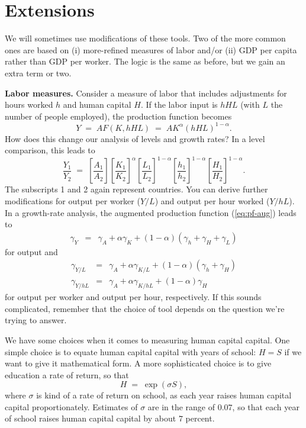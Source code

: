 \section{Extensions}

We will sometimes use modifications of these tools.
Two of the more common ones are based on
(i) more-refined measures of labor
and/or (ii) GDP per capita rather than GDP per worker.
The logic is the same as before, but we gain an extra term or two.


\textbf{Labor measures.} Consider a measure of labor that includes
adjustments for hours worked $h$ and human capital  $H$.
If the labor input is $hHL$ (with $L$ the number of people employed),
the production function becomes
\begin{equation}
    Y \;=\; A F(K,hHL) \;=\; A K^\alpha (hHL)^{1-\alpha} .
    \label{eq:pf-aug}
\end{equation}
How does this change our analysis of levels and growth rates?
In a  level comparison, this leads to
\[
    \frac{Y_1}{Y_2} \;=\;
             \left[ \frac{A_1}{A_2} \right]
             \left[ \frac{K_1}{K_2} \right]^\alpha
             \left[ \frac{L_1}{L_2} \right]^{1-\alpha}
             \left[ \frac{h_1}{h_2} \right]^{1-\alpha}
             \left[ \frac{H_1}{H_2} \right]^{1-\alpha} .
\]
The subscripts 1 and 2 again represent countries.
You can derive further modifications for output per worker ($Y/L$)
and output per hour worked ($Y/hL$).
In a growth-rate analysis,
the augmented production function (\ref{eq:pf-aug})
leads to
\begin{eqnarray*}
    \gamma_Y &=& \gamma_A + \alpha \gamma_K + (1-\alpha)
        (\gamma_h + \gamma_H + \gamma_L)
\end{eqnarray*}
for output and
\begin{eqnarray*}
    \gamma_{Y/L} &=&  \gamma_A
                + \alpha \gamma_{K/L}
                    + (1-\alpha) (\gamma_h + \gamma_H ) \\
    \gamma_{Y/hL} &=&  \gamma_A
                + \alpha \gamma_{K/hL}
                    + (1-\alpha) \gamma_H
\end{eqnarray*}
for output per worker and output per hour, respectively.
If this sounds complicated, remember that the choice of tool
depends on the question we're trying to answer.

We have some choices when it comes to measuring human capital  capital.
One simple choice is to equate human capital  capital with years of school:
$H = S$ if we want to give it mathematical form.
A more sophisticated choice is to give education a rate of return,
so that
\begin{equation}
    H \;=\; \exp( \sigma S ) ,
    \label{eq:mincer}
\end{equation}
where $\sigma$ is kind of a rate of return on school,
as each year raises human capital  capital proportionately.
Estimates of $\sigma$ are in the range of $0.07$,
so that each year of school raises human capital  capital by
about $7$ percent.


